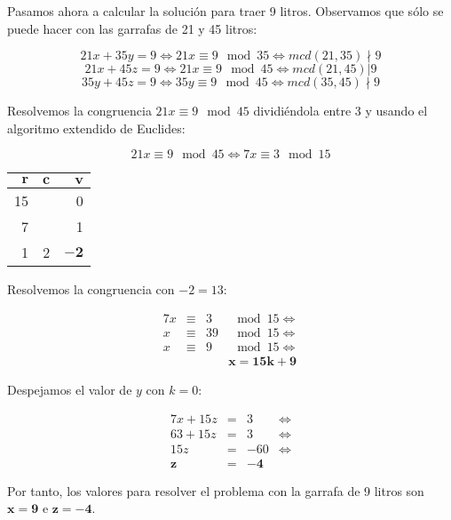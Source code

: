 \pagebreak

Pasamos ahora a calcular la solución para traer 9 litros.
Observamos que sólo se puede hacer con las garrafas de 21 y 45 litros:

\[21x + 35y = 9 \iff 21x \equiv 9 \mod 35 \iff mcd(21,35)\nmid9\]
\[21x + 45z = 9 \iff 21x \equiv 9 \mod 45 \iff mcd(21,45)|9\]
\[35y + 45z = 9 \iff 35y \equiv 9 \mod 45 \iff mcd(35,45)\nmid9\]

Resolvemos la congruencia $21x \equiv 9 \mod 45$ dividiéndola entre 3 y usando el algoritmo extendido de Euclides:

\[21x \equiv 9 \mod 45 \iff 7x \equiv 3 \mod 15\]

\begin{center}
\begin{tabular}{r r r}
	$\boldsymbol{r}$ & $\boldsymbol{c}$ & $\boldsymbol{v}$  \\
	\toprule
	15               &                  & 0                 \\
	7                &                  & 1                 \\
	1                & 2                & $\boldsymbol{-2}$ \\
\end{tabular}
\end{center}

Resolvemos la congruencia con $-2 = 13$:

\[
\begin{array}{rcrl}
	7x & \equiv & 3  & \mod 15 \iff \\
	x  & \equiv & 39 & \mod 15 \iff \\
	x  & \equiv & 9  & \mod 15 \iff \\
      &        &    & \boldsymbol{x = 15k + 9}
\end{array}
\]

Despejamos el valor de $y$ con $k = 0$:

\[
\begin{array}{rcll}
	7x + 15z       & =              & 3               & \iff \\
	63 + 15z       & =              & 3               & \iff \\
	15z            & =              & -60             & \iff \\
	\boldsymbol{z} & \boldsymbol{=} & \boldsymbol{-4} &
\end{array}
\]

Por tanto, los valores para resolver el problema con la garrafa de 9 litros son $\boldsymbol{x = 9}$ e $\boldsymbol{z = -4}$.

